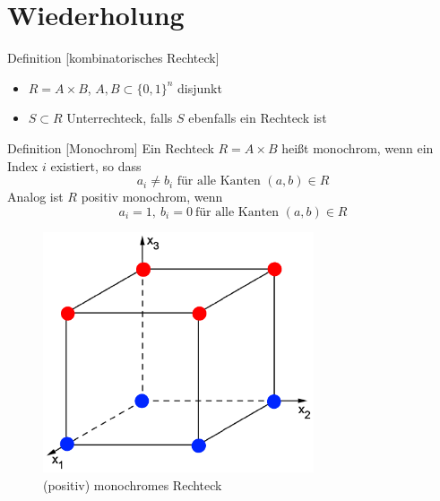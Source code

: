\section{Wiederholung}

\begin{frame}
    \begin{block}{Definition [kombinatorisches Rechteck]}
        \begin{itemize}
            \item $R = A \times B$, $A, B \subset \{0, 1\}^n $ disjunkt
            \item $S\subset R$ Unterrechteck, falls $S$ ebenfalls ein Rechteck ist
        \end{itemize}
    \end{block}
\end{frame}

\begin{frame}
    \begin{block}{Definition [Monochrom]}
        Ein Rechteck $R = A\times B$ heißt monochrom, wenn ein Index $i$ existiert, so dass
        \newline
        \[ 
            a_i \neq b_i \text{ für alle Kanten } (a,b) \in R 
        \]
        Analog ist $R$ positiv monochrom, wenn
        \[
            a_i = 1,\ b_i = 0\ \text{für alle Kanten } (a,b) \in R
        \]
    \end{block}
\end{frame}

\begin{frame}
    \begin{figure}
        \centering
        \includegraphics[width=80mm,scale=0.5]{monochrom1.png}
        \caption{(positiv) monochromes Rechteck}
    \end{figure}
\end{frame}

